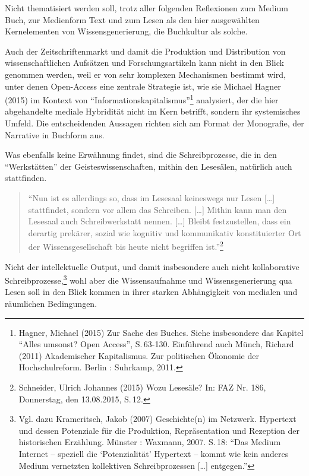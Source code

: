 \documentclass[a4paper,
fontsize=11pt,
oneside,
numbers=noperiodatend,
parskip=half-,
bibliography=totoc,
final
]{scrartcl}
\begin{document}
Nicht thematisiert werden soll, trotz aller folgenden Reflexionen zum
Medium Buch, zur Medienform Text und zum Lesen als den hier ausgewählten
Kernelementen von Wissensgenerierung, die Buchkultur als solche.

Auch der Zeitschriftenmarkt und damit die Produktion und Distribution
von wissenschaftlichen Aufsätzen und Forschungsartikeln kann nicht in
den Blick genommen werden, weil er von sehr komplexen Mechanismen
bestimmt wird, unter denen Open-Access eine zentrale Strategie ist, wie
sie Michael Hagner (2015) im Kontext von
\enquote{Informationskapitalismus}\footnote{Hagner, Michael (2015) Zur
  Sache des Buches. Siehe insbesondere das Kapitel \enquote{Alles
  umsonst? Open Access}, S.\,63-130. Einführend auch Münch, Richard
  (2011) Akademischer Kapitalismus. Zur politischen Ökonomie der
  Hochschulreform. Berlin : Suhrkamp, 2011.} analysiert, der die hier
abgehandelte mediale Hybridität nicht im Kern betrifft, sondern ihr
systemisches Umfeld. Die entscheidenden Aussagen richten sich am Format
der Monografie, der Narrative in Buchform aus.

Was ebenfalls keine Erwähnung findet, sind die Schreibprozesse, die in
den \enquote{Werkstätten} der Geisteswissenschaften, mithin den
Lesesälen, natürlich auch stattfinden.

\begin{quote}
\enquote{Nun ist es allerdings so, dass im Lesesaal keineswegs nur Lesen
{[}\ldots{}{]} stattfindet, sondern vor allem das Schreiben.
{[}\ldots{}{]} Mithin kann man den Lesesaal auch Schreibwerkstatt
nennen. {[}\ldots{}{]} Bleibt festzustellen, dass ein derartig prekärer,
sozial wie kognitiv und kommunikativ konstituierter Ort der
Wissensgesellschaft bis heute nicht begriffen ist.}\footnote{Schneider,
  Ulrich Johannes (2015) Wozu Lesesäle? In: FAZ Nr. 186, Donnerstag, den
  13.08.2015, S.\,12.}
\end{quote}

Nicht der intellektuelle Output, und damit insbesondere auch nicht
kollaborative Schreibprozesse,\footnote{Vgl. dazu Krameritsch, Jakob
  (2007) Geschichte(n) im Netzwerk. Hypertext und dessen Potenziale für
  die Produktion, Repräsentation und Rezeption der historischen
  Erzählung. Münster : Waxmann, 2007. S.\,18: \enquote{Das Medium
  Internet -- speziell die \enquote{Potenzialität} Hypertext -- kommt
  wie kein anderes Medium vernetzten kollektiven Schreibprozessen
  {[}\ldots{}{]} entgegen.}} wohl aber die Wissensaufnahme und
Wissensgenerierung qua Lesen soll in den Blick kommen in ihrer starken
Abhängigkeit von medialen und räumlichen Bedingungen.
\end{document}
